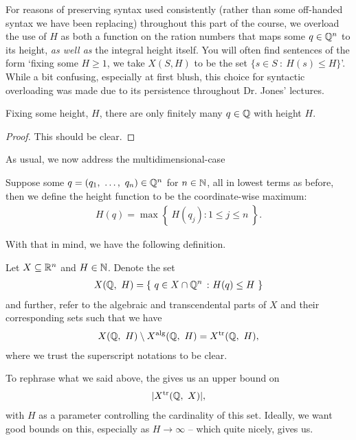 \begin{svgraybox}
  For reasons of preserving syntax used consistently (rather than some off-handed syntax we have been replacing) throughout this part of the course, we overload the use of $H$ as both a function on the ration numbers that maps some $q \in \Q^n$ to its height, \emph{as well as} the integral height itself. You will often find sentences of the form `fixing some $H \geq 1$, we take $X(S, H)$ to be the set $\{ s \in S \ \colon \ H(s) \leq H \}$'. While a bit confusing, especially at first blush, this choice for syntactic overloading was made due to its persistence throughout Dr. Jones' lectures.
\end{svgraybox}


\begin{corollary}
  Fixing some height, $H$, there are only finitely many $q \in \Q$ with height $H$.
\end{corollary}
\begin{proof}
  This should be clear.
\end{proof}

As usual, we now address the multidimensional-case
\begin{definition}
  Suppose some $q = (\vonevm{q}{n}) \in \Q^n$ for $n \in \N$, all in lowest terms as before, then we define the height function to be the coordinate-wise maximum:
    \begin{align*}
      H(q) = \max{ \left\{ \ H(q_j) \colon 1 \leq j \leq n \ \right\} }.
    \end{align*}
  \label{defn:Qn_height}
\end{definition}

With that in mind, we have the following definition.
\begin{definition}
  Let $\XRn[X]{n}$ and $H \in \N$. Denote the set
    \begin{align*}
      \XQH[H] = \left\{ \ q \in X \cap \Q^n \ \colon H(q) \leq H \ \right\}
    \end{align*}
    and further, refer to the algebraic and transcendental parts of $X$ and their corresponding sets such that we have
    \begin{align*}
      \XQH[H] \setminus \XalgQH[H] = \XtrQH[H],
    \end{align*}
    where we trust the superscript notations to be clear.
  \label{defn:height_sets}
\end{definition}

To rephrase what we said above, the \pwt gives us an upper bound on
  \begin{align*}
    \card{\XtrQH[X]},
  \end{align*}
  with $H$ as a parameter controlling the cardinality of this set. Ideally, we want good bounds on this, especially as $H \to \infty$ -- which quite nicely, \pw gives us.

